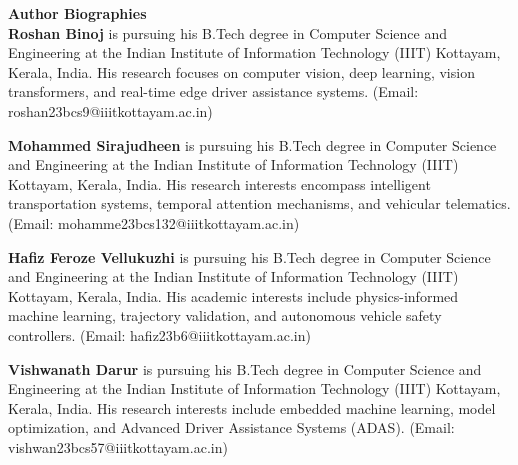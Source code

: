 \documentclass{article}
\begin{document}
\textbf{Author Biographies}\\

\textbf{Roshan Binoj} is pursuing his B.Tech degree in Computer Science and Engineering at the Indian Institute of Information Technology (IIIT) Kottayam, Kerala, India. His research focuses on computer vision, deep learning, vision transformers, and real-time edge driver assistance systems. (Email: roshan23bcs9@iiitkottayam.ac.in)\par\vspace{0.8em}

\textbf{Mohammed Sirajudheen} is pursuing his B.Tech degree in Computer Science and Engineering at the Indian Institute of Information Technology (IIIT) Kottayam, Kerala, India. His research interests encompass intelligent transportation systems, temporal attention mechanisms, and vehicular telematics. (Email: mohamme23bcs132@iiitkottayam.ac.in)\par\vspace{0.8em}

\textbf{Hafiz Feroze Vellukuzhi} is pursuing his B.Tech degree in Computer Science and Engineering at the Indian Institute of Information Technology (IIIT) Kottayam, Kerala, India. His academic interests include physics-informed machine learning, trajectory validation, and autonomous vehicle safety controllers. (Email: hafiz23b6@iiitkottayam.ac.in)\par\vspace{0.8em}

\textbf{Vishwanath Darur} is pursuing his B.Tech degree in Computer Science and Engineering at the Indian Institute of Information Technology (IIIT) Kottayam, Kerala, India. His research interests include embedded machine learning, model optimization, and Advanced Driver Assistance Systems (ADAS). (Email: vishwan23bcs57@iiitkottayam.ac.in)\par
\end{document}

